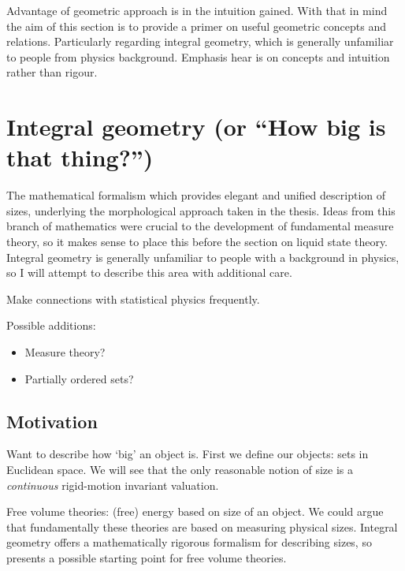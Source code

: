 Advantage of geometric approach is in the intuition gained.
With that in mind the aim of this section is to provide a primer on useful geometric concepts and relations.
Particularly regarding integral geometry, which is generally unfamiliar to people from physics background.
Emphasis hear is on concepts and intuition rather than rigour.

\section{Integral geometry (or ``How big is that thing?'')}

The mathematical formalism which provides elegant and unified description of sizes, underlying the morphological approach taken in the thesis.
Ideas from this branch of mathematics were crucial to the development of fundamental measure theory, so it makes sense to place this before the section
on liquid state theory.
Integral geometry is generally unfamiliar to people with a background in physics, so I will attempt to describe this area with additional care.

Make connections with statistical physics frequently.

Possible additions:
\begin{itemize}
\item Measure theory?
\item Partially ordered sets?
\end{itemize}

\subsection{Motivation}

Want to describe how `big' an object is.
First we define our objects: sets in Euclidean space.
We will see that the only reasonable notion of size is a \emph{continuous} rigid-motion invariant valuation.

Free volume theories: (free) energy based on size of an object.
We could argue that fundamentally these theories are based on measuring physical sizes.
Integral geometry offers a mathematically rigorous formalism for describing sizes, so presents a possible starting point for free volume theories.


